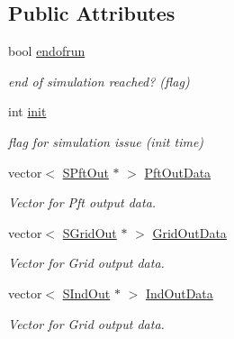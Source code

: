 \subsection*{Public Attributes}
\begin{DoxyCompactItemize}
\item 
\mbox{\label{class_c_envir_aad319ec2d20fdd415f1d9d5e64d69aa6}} 
bool \mbox{\hyperlink{class_c_envir_aad319ec2d20fdd415f1d9d5e64d69aa6}{endofrun}}
\begin{DoxyCompactList}\small\item\em end of simulation reached? (flag) \end{DoxyCompactList}\item 
\mbox{\label{class_c_envir_ad2d296257d6ecc2199197fcd283b9793}} 
int \mbox{\hyperlink{class_c_envir_ad2d296257d6ecc2199197fcd283b9793}{init}}
\begin{DoxyCompactList}\small\item\em flag for simulation issue (init time) \end{DoxyCompactList}\item 
\mbox{\label{class_c_envir_ae1f003b7e476e6cc334c91296be37870}} 
vector$<$ \mbox{\hyperlink{struct_s_pft_out}{S\+Pft\+Out}} $\ast$ $>$ \mbox{\hyperlink{class_c_envir_ae1f003b7e476e6cc334c91296be37870}{Pft\+Out\+Data}}
\begin{DoxyCompactList}\small\item\em Vector for Pft output data. \end{DoxyCompactList}\item 
\mbox{\label{class_c_envir_ab4616b4a1f470fc8a0d6a5b2f29a7f44}} 
vector$<$ \mbox{\hyperlink{struct_s_grid_out}{S\+Grid\+Out}} $\ast$ $>$ \mbox{\hyperlink{class_c_envir_ab4616b4a1f470fc8a0d6a5b2f29a7f44}{Grid\+Out\+Data}}
\begin{DoxyCompactList}\small\item\em Vector for Grid output data. \end{DoxyCompactList}\item 
\mbox{\label{class_c_envir_a6069779962f20bd7962b3efb20d375ac}} 
vector$<$ \mbox{\hyperlink{struct_s_ind_out}{S\+Ind\+Out}} $\ast$ $>$ \mbox{\hyperlink{class_c_envir_a6069779962f20bd7962b3efb20d375ac}{Ind\+Out\+Data}}
\begin{DoxyCompactList}\small\item\em Vector for Grid output data. \end{DoxyCompactList}\item 

\end{DoxyCompactItemize}
